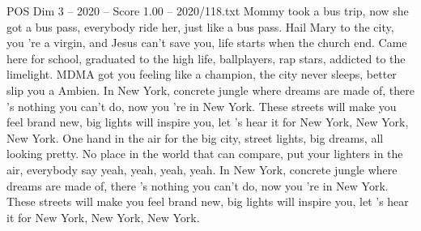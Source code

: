 \begin{textsample}{POS Dim 3 – 2020 – Score 1.00 – 2020/118.txt}
Mommy took a bus trip, now she got a bus pass, everybody ride her, just like a bus pass.
Hail Mary to the city, you 're a virgin, and Jesus can't save you, life starts when the church end.
Came here for school, graduated to the high life, ballplayers, rap stars, addicted to the limelight.
MDMA got you feeling like a champion, the city never sleeps, better slip you a Ambien.
In New York, concrete jungle where dreams are made of, there 's nothing you can't do, now you 're in New York.
These streets will make you feel brand new, big lights will inspire you, let 's hear it for New York, New York, New York.
One hand in the air for the big city, street lights, big dreams, all looking pretty.
No place in the world that can compare, put your lighters in the air, everybody say yeah, yeah, yeah, yeah.
In New York, concrete jungle where dreams are made of, there 's nothing you can't do, now you 're in New York.
These streets will make you feel brand new, big lights will inspire you, let 's hear it for New York, New York, New York.

\end{textsample}
